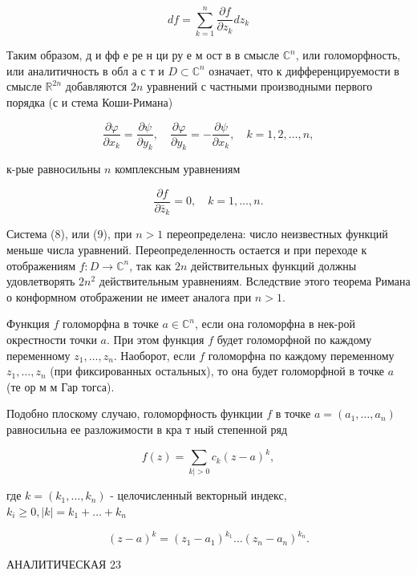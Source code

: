 \documentclass[10pt]{article}
\begin{document}
\[

d f=\sum_{k=1}^{n} \frac{\partial f}{\partial z_{k}} d z_{k}

\]



Таким образом, д и фф е ре н ци ру е м ост в в смысле $\mathbb{C}^{n}$, или голоморфность, или аналитичность в обл а с т и $D \subset \mathbb{C}^{n}$ означает, что к дифференцируемости в смысле $\mathbb{R}^{2 n}$ добавляются $2 n$ уравнений с частными производными первого порядка (с и стема Коши-Римана)



\[

\frac{\partial \varphi}{\partial x_{k}}=\frac{\partial \psi}{\partial y_{k}}, \quad \frac{\partial \varphi}{\partial y_{k}}=-\frac{\partial \psi}{\partial x_{k}}, \quad k=1,2, \ldots, n,

\]



к-рые равносильны $n$ комплексным уравнениям



\[

\frac{\partial f}{\partial \bar{z}_{k}}=0, \quad k=1, \ldots, n .

\]



Система (8), или (9), при $n>1$ переопределена: число неизвестных функций меньше числа уравнений. Переопределенность остается и при переходе к отображениям $f: D \rightarrow \mathbb{C}^{n}$, так как $2 n$ действительных функций должны удовлетворять $2 n^{2}$ действительным уравнениям. Вследствие этого теорема Римана о конформном отображении не имеет аналога при $n>1$.



Функция $f$ голоморфна в точке $a \in \mathbb{C}^{n}$, если она голоморфна в нек-рой окрестности точки $a$. При этом функция $f$ будет голоморфной по каждому переменному $z_{1}, \ldots, z_{n}$. Наоборот, если $f$ голоморфна по каждому переменному $z_{1}, \ldots, z_{n}$ (при фиксированных остальных), то она будет голоморфной в точке $a$ (те ор м м Гар тогса).



Подобно плоскому случаю, голоморфность функции $f$ в точке $a=\left(a_{1}, \ldots, a_{n}\right)$ равносильна ее разложимости в кра т ный степенной ряд



\[

f(z)=\sum_{k \mid>0} c_{k}(z-a)^{k},

\]



где $k=\left(k_{1}, \ldots, k_{n}\right)$ - целочисленный векторный индекс, $k_{i} \geqslant 0,|k|=k_{1}+\ldots+k_{n}$



\[

(z-a)^{k}=\left(z_{1}-a_{1}\right)^{k_{1}} \ldots\left(z_{n}-a_{n}\right)^{k_{n}} .

\]



АНАЛИТИЧЕСКАЯ 23
\end{document}
